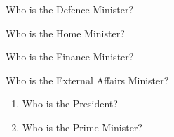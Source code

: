 \documentclass{article}
\begin{document}
\begin{question}
  Who is the Defence Minister?
\end{question}
\begin{question}
  Who is the Home Minister?
\end{question}
\begin{question}
  Who is the Finance Minister?
\end{question}
\begin{question}
  Who is the External Affairs Minister?
\end{question}

\begin{exercise}[title=Answer the following in one sentence:]
  \begin{enumerate}
    \item Who is the President?
    \item Who is the Prime Minister?
  \end{enumerate}
\end{exercise}
\end{document}
